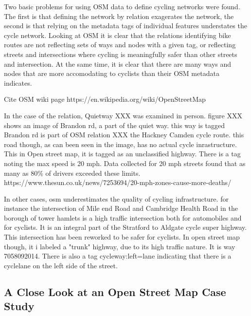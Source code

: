 Two basic problems for using OSM data to define cycling networks were found. The first is that defining the network by relation exagerates the network, the second is that relying on the metadata tags of individual features understates the cycle network. Looking at OSM it is clear that the relations identifying bike routes are not reflecting sets of ways and nodes with a given tag, or reflecting streets and intersections where cycling is meaningfully safer than other streets and intersection. At the same time, it is clear that there are many ways and nodes that are more accomodating to cyclists than their OSM metadata indicates. 


Cite OSM wiki page
https://en.wikipedia.org/wiki/OpenStreetMap





In the case of the relation, Quietway XXX was examined in person. figure XXX shows an image of Brandon rd, a part of the quiet way. this way is tagged
Brandon rd is part of OSM relation XXX the Hackney Camden cycle route.  this road though, as can been seen in the image, has no actual cycle inrastructure. This in Open street map, it is tagged as an unclassified highway. There is a tag noting the max speed is 20 mph. Data collected for 20 mph streets found that as many as 80\% of drivers exceeded these limits. 
https://www.thesun.co.uk/news/7253694/20-mph-zones-cause-more-deaths/

In other cases, osm underestimates the quality of cycling infrastructure. for instance the intersection of Mile end Road and Cambridge Health Road in the borough of tower hamlets is a high traffic intersection both for automobiles and for cyclists. It is an integral part of the Stratford to Aldgate cycle super highway. This intersection has been reworked to be safer for cyclists. In open street map though, it i labeled a "trunk" highway, due to its high traffic nature. It is way 7058092014. There is also a tag cycleway:left=lane indicating that there is a cyclelane on the left side of the street. 

\cite{osm}

\subsection{A Close Look at an Open Street Map Case Study}

